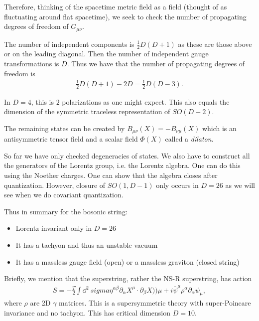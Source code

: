 Therefore, thinking of the spacetime metric field as a field (thought of as fluctuating around flat spacetime), we seek to check the number of propagating degrees of freedom of $G_{\mu \nu}$.

The number of independent components is $\frac{1}{2} D \left(  D + 1 \right) $ as these are those above or on the leading diagonal. Then the number of independent gauge transformations is $D$. Thus we have that the number of propagating degrees of freedom is
\begin{align}
    \frac{1}{2} D \left( D + 1 \right) - 2D = \frac{1}{2} D \left( D - 3 \right) 
.\end{align}

In $D = 4$, this is $2$ polarizations as one might expect. This also equals the dimension of the symmetric traceless representation of $SO \left( D- 2 \right) $.

The remaining states can be created by $B_{\mu \nu} \left( X \right) = - B_{\nu \mu}\left( X \right) $ which is an antisymmetric tensor field and a scalar field $\Phi \left( X \right) $ called a \emph{dilaton}.

So far we have only checked degeneracies of states. We also have to construct all the generators of the Lorentz group, i.e. the Lorentz algebra. One can do this using the Noether charges. One can show that the algebra closes after quantization. However, closure of $SO \left( 1, D - 1 \right) $ only occurs in $D = 26$ as we will see when we do covariant quantization.

Thus in summary for the bosonic string:
\begin{itemize}
    \item Lorentz invariant only in $D = 26$
    \item It has a tachyon and thus an unstable vacuum
    \item It has a massless gauge field (open) or a massless graviton (closed string)
\end{itemize}

Briefly, we mention that the superstring, rather the NS-R superstring, has action
\begin{align}
    S = -\frac{T}{2} \int \dd{^2\ sigma} \eta^{\alpha \beta} \partial_\alpha X^{\mu} \cdot \partial_\beta X))\mu + i \overline{\psi}^{\mu} \rho^{\alpha} \partial_\alpha \psi_{\mu}
,\end{align}
where $\rho$ are 2D $\gamma$ matrices. This is a supersymmetric theory with super-Poincare invariance and no tachyon. This has critical dimension $D = 10$.

